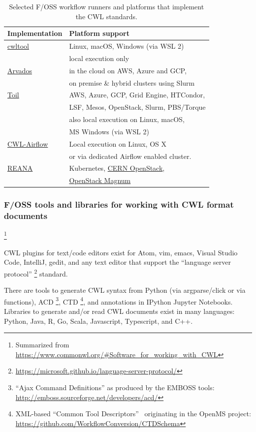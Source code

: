 \documentclass[sigconf,revew,screen,timestamp,nonacm]{acmart}
\newcommand{\addition}[1]{{\color{brown} #1}}
\newcommand{\modification}[1]{{\color{blue} #1}}
\newcommand{\todortwo}[1]{\todo[linecolor=white,color=KamPurple!40]{R2.#1}}
\newcommand{\todorthree}[1]{\todo[color=OwnAzure!40]{R3.#1}}
\begin{document}
\begin{table}
  \caption{Selected F/OSS workflow runners and platforms that implement the CWL standards.}
  \label{tab:runners}
    \begin{tabular}{ll}
      \toprule
      Implementation & Platform support\\
      \midrule
      \href{https://pypi.org/project/cwltool}{cwltool} & Linux, macOS, Windows (via WSL 2) \\
      & local execution only\\
      \href{https://arvados.org}{Arvados} & in the cloud on AWS, Azure and GCP, \\
      & on premise \& hybrid clusters using Slurm\\
      \href{https://pypi.org/project/toil-cwl-runner}{Toil} & AWS, Azure, GCP, Grid Engine, HTCondor, \\
      & LSF, Mesos, OpenStack, Slurm, PBS/Torque\\
      & also local execution on Linux, macOS, \\
      & MS Windows (via WSL 2)\\
      \href{https://pypi.org/project/cwl-airflow}{CWL-Airflow} & Local execution on Linux, OS X\\
      & or via dedicated Airflow enabled cluster.\\
      \href{https://docs.reana.io/}{REANA} & Kubernetes, \href{https://clouddocs.web.cern.ch/clouddocs/containers/}{CERN OpenStack},\\
      & \href{https://wiki.openstack.org/wiki/Magnum}{OpenStack Magnum}\\
      \bottomrule
\end{tabular}
\end{table}

\subsubsection{F/OSS tools and libraries for working with CWL \addition{format documents}}\footnote{Summarized from \url{https://www.commonwl.org/\#Software_for_working_with_CWL}}\label{sec:sidebar:b:workwith}

CWL plugins for text/code editors exist for Atom, vim, emacs, Visual Studio Code, IntelliJ, gedit, and any text editor that support the ``language server protocol''\todortwo{19} \footnote{\addition{\url{https://microsoft.github.io/language-server-protocol/}}} standard.

There are tools to generate CWL \addition{syntax} from Python \todorthree{7}(via argparse/click \modification{or via functions}), ACD\addition{\footnote{``Ajax Command Definitions'' as produced by the EMBOSS tools: \url{http://emboss.sourceforge.net/developers/acd/}}}, CTD\addition{\footnote{XML-based ``Common Tool Descriptors''~\cite{de_la_garza_desktop_2016} originating in the OpenMS project: \url{https://github.com/WorkflowConversion/CTDSchema}}}, and annotations in IPython Jupyter Notebooks. Libraries to generate and/or read CWL \addition{documents} exist in many languages: Python, Java, R, Go, Scala, \addition{Javascript, Typescript,} and C++.
\end{document}
